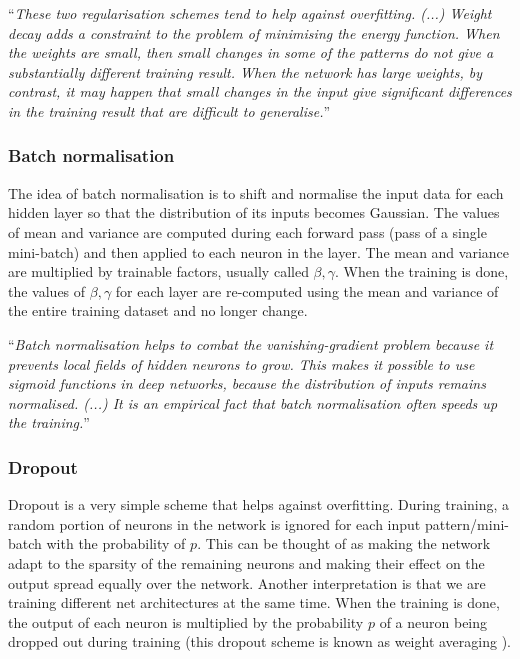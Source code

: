 \enquote{\textit{These two regularisation schemes tend to help against overfitting. (...) Weight decay adds a constraint to the problem of minimising the energy function. When the weights are small, then small changes in some of the patterns do not give a substantially different training result. When the network has large weights, by contrast, it may happen that small changes in the input give significant differences in the training result that are difficult to generalise.}} \cite{mehlig}

\subsubsection{Batch normalisation}

The idea of batch normalisation is to shift and normalise the input data for each
hidden layer so that the distribution of its inputs becomes Gaussian. The values of mean and variance are computed during each forward pass (pass of a single mini-batch) and then applied to each neuron in the layer. The mean and variance are multiplied by trainable factors, usually called $ \beta, \gamma $. \cite{stanford-L6} \cite{mehlig} When the training is done, the values of $ \beta, \gamma $ for each layer are re-computed using the mean and variance of the entire training dataset and no longer change. \cite{issue}

\enquote{\textit{Batch normalisation helps to combat the vanishing-gradient problem because it prevents local fields of hidden neurons to grow. This makes it possible to use sigmoid functions in deep networks, because the distribution of inputs remains normalised. (...) It is an empirical fact that batch normalisation often speeds up the training.}} \cite{mehlig}

\subsubsection{Dropout}
\label{dropout_sec}

Dropout is a very simple scheme that helps against overfitting. During training, a random portion of neurons in the network is ignored for each input pattern/mini-batch with the probability of $ p $. This can be thought of as making the network adapt to the sparsity of the remaining neurons and making their effect on the output spread equally over the network. Another interpretation is that we are training different net architectures at the same time. When the training is done, the output of each neuron is multiplied by the probability $ p $ of a neuron being dropped out during training (this dropout scheme is known as weight averaging \cite{segnet}). \cite{mehlig} \cite{stanford-L7}

